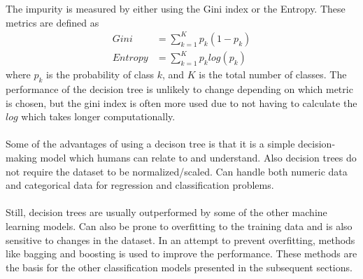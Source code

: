 \documentclass[a4paper,twocolumn]{article}
\begin{document}
The impurity is measured by either using the Gini index or the Entropy. These metrics are defined as
\begin{align}
    Gini &= \sum_{k = 1}^{K} p_{k}(1 - p_{k})\\
    Entropy &= \sum_{k = 1}^{K} p_{k} log(p_{k})
\end{align}
where $p_{k}$ is the probability of class $k$, and $K$ is the total number of classes. The performance of the decision tree is unlikely to change depending on which metric is chosen, but the gini index is often more used due to not having to calculate the $log$ which takes longer computationally.\\
\\
Some of the advantages of using a decison tree is that it is a simple decision-making model which humans can relate to and understand. Also decision trees do not require the dataset to be normalized/scaled. Can handle both numeric data and categorical data for regression and classification problems.\\
\\
Still, decision trees are usually outperformed by some of the other machine learning models. Can also be prone to overfitting to the training data and is also sensitive to changes in the dataset. In an attempt to prevent overfitting, methods like bagging and boosting is used to improve the performance. These methods are the basis for the other classification models presented in the subsequent sections.
\end{document}
